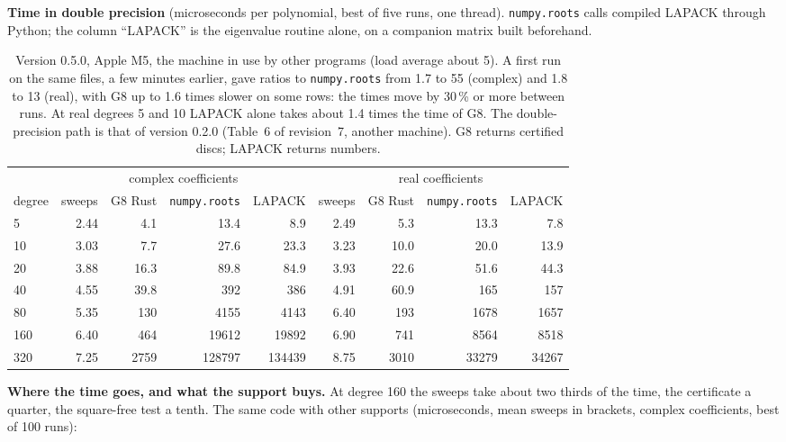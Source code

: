 \documentclass[10pt,a4paper]{article}
\theoremstyle{definition}
\numberwithin{equation}{section}
\begin{document}
\textbf{Time in double precision} (microseconds per polynomial, best of five runs, one thread).
\texttt{numpy.roots} calls compiled LAPACK through Python; the column ``LAPACK'' is the eigenvalue
routine alone, on a companion matrix built beforehand.
\begin{table}[H]\centering\small\setlength{\tabcolsep}{4.5pt}
\begin{tabular}{lrrrr@{\qquad}rrrr}
\toprule
 & \multicolumn{4}{c}{complex coefficients} & \multicolumn{4}{c}{real coefficients}\\
degree & sweeps & G8 Rust & \texttt{numpy.roots} & LAPACK & sweeps & G8 Rust & \texttt{numpy.roots} & LAPACK\\
\midrule
5 & 2.44 & 4.1 & 13.4 & 8.9 & 2.49 & 5.3 & 13.3 & 7.8\\
10 & 3.03 & 7.7 & 27.6 & 23.3 & 3.23 & 10.0 & 20.0 & 13.9\\
20 & 3.88 & 16.3 & 89.8 & 84.9 & 3.93 & 22.6 & 51.6 & 44.3\\
40 & 4.55 & 39.8 & 392 & 386 & 4.91 & 60.9 & 165 & 157\\
80 & 5.35 & 130 & 4155 & 4143 & 6.40 & 193 & 1678 & 1657\\
160 & 6.40 & 464 & 19612 & 19892 & 6.90 & 741 & 8564 & 8518\\
320 & 7.25 & 2759 & 128797 & 134439 & 8.75 & 3010 & 33279 & 34267\\
\bottomrule
\end{tabular}
\caption{Version 0.5.0, Apple M5, the machine in use by other programs (load average about 5). A first run
on the same files, a few minutes earlier, gave ratios to \texttt{numpy.roots} from 1.7 to 55 (complex)
and 1.8 to 13 (real), with G8 up to 1.6 times slower on some rows: the times move by 30\,\% or more
between runs. At real degrees 5 and 10 LAPACK alone takes about 1.4 times the time of G8.
The double-precision path is that of version 0.2.0 (Table~6 of revision~7, another machine).
G8 returns certified discs; LAPACK returns numbers.}\label{tab:time}
\end{table}
\textbf{Where the time goes, and what the support buys.} At degree 160 the sweeps take about two thirds
of the time, the certificate a quarter, the square-free test a tenth. The same code with other supports
(microseconds, mean sweeps in brackets, complex coefficients, best of 100 runs):
\end{document}
